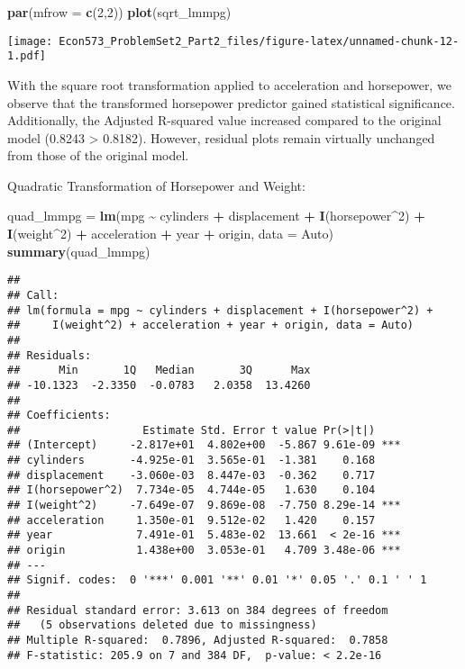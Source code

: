 \documentclass[
]{article}
\newenvironment{Shaded}{\begin{snugshade}}{\end{snugshade}}
\newcommand{\AttributeTok}[1]{\textcolor[rgb]{0.13,0.29,0.53}{#1}}
\newcommand{\DecValTok}[1]{\textcolor[rgb]{0.00,0.00,0.81}{#1}}
\newcommand{\FunctionTok}[1]{\textcolor[rgb]{0.13,0.29,0.53}{\textbf{#1}}}
\newcommand{\NormalTok}[1]{#1}
\newcommand{\OtherTok}[1]{\textcolor[rgb]{0.56,0.35,0.01}{#1}}
\newcommand{\SpecialCharTok}[1]{\textcolor[rgb]{0.81,0.36,0.00}{\textbf{#1}}}
\begin{document}
\begin{Shaded}
\begin{Highlighting}[]
\FunctionTok{par}\NormalTok{(}\AttributeTok{mfrow =} \FunctionTok{c}\NormalTok{(}\DecValTok{2}\NormalTok{,}\DecValTok{2}\NormalTok{))}
\FunctionTok{plot}\NormalTok{(sqrt\_lmmpg)}
\end{Highlighting}
\end{Shaded}

\texttt{[image: Econ573\_ProblemSet2\_Part2\_files/figure-latex/unnamed-chunk-12-1.pdf]}

With the square root transformation applied to acceleration and
horsepower, we observe that the transformed horsepower predictor gained
statistical significance. Additionally, the Adjusted R-squared value
increased compared to the original model (0.8243 \textgreater{} 0.8182).
However, residual plots remain virtually unchanged from those of the
original model.

Quadratic Transformation of Horsepower and Weight:

\begin{Shaded}
\begin{Highlighting}[]
\NormalTok{quad\_lmmpg }\OtherTok{=} \FunctionTok{lm}\NormalTok{(mpg }\SpecialCharTok{\textasciitilde{}}\NormalTok{ cylinders }\SpecialCharTok{+}\NormalTok{ displacement }\SpecialCharTok{+} \FunctionTok{I}\NormalTok{(horsepower}\SpecialCharTok{\^{}}\DecValTok{2}\NormalTok{) }\SpecialCharTok{+} \FunctionTok{I}\NormalTok{(weight}\SpecialCharTok{\^{}}\DecValTok{2}\NormalTok{) }\SpecialCharTok{+}\NormalTok{ acceleration }\SpecialCharTok{+}\NormalTok{ year }\SpecialCharTok{+}\NormalTok{ origin, }\AttributeTok{data =}\NormalTok{ Auto)}
\FunctionTok{summary}\NormalTok{(quad\_lmmpg)}
\end{Highlighting}
\end{Shaded}

\begin{verbatim}
## 
## Call:
## lm(formula = mpg ~ cylinders + displacement + I(horsepower^2) + 
##     I(weight^2) + acceleration + year + origin, data = Auto)
## 
## Residuals:
##      Min       1Q   Median       3Q      Max 
## -10.1323  -2.3350  -0.0783   2.0358  13.4260 
## 
## Coefficients:
##                   Estimate Std. Error t value Pr(>|t|)    
## (Intercept)     -2.817e+01  4.802e+00  -5.867 9.61e-09 ***
## cylinders       -4.925e-01  3.565e-01  -1.381    0.168    
## displacement    -3.060e-03  8.447e-03  -0.362    0.717    
## I(horsepower^2)  7.734e-05  4.744e-05   1.630    0.104    
## I(weight^2)     -7.649e-07  9.869e-08  -7.750 8.29e-14 ***
## acceleration     1.350e-01  9.512e-02   1.420    0.157    
## year             7.491e-01  5.483e-02  13.661  < 2e-16 ***
## origin           1.438e+00  3.053e-01   4.709 3.48e-06 ***
## ---
## Signif. codes:  0 '***' 0.001 '**' 0.01 '*' 0.05 '.' 0.1 ' ' 1
## 
## Residual standard error: 3.613 on 384 degrees of freedom
##   (5 observations deleted due to missingness)
## Multiple R-squared:  0.7896, Adjusted R-squared:  0.7858 
## F-statistic: 205.9 on 7 and 384 DF,  p-value: < 2.2e-16
\end{verbatim}
\end{document}
